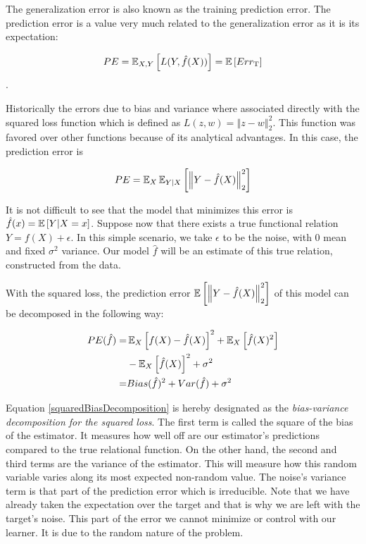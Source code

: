 The generalization error is also known as the training prediction error. The prediction error is a value very much related to the generalization error as it is its expectation:

\begin{equation}
 PE = \operatorname{\mathbb{E}}_{X,Y} \left[ L(Y,\hat{f}(X))\right] = \operatorname{\mathbb{E}} \left[ Err_{\mathrm{T}} \right]
 \end{equation}.

Historically the errors due to bias and variance where associated directly with the squared loss function which is defined as $L(z,w) = \left\Vert z-w \right\Vert^2_2$. This function was favored over other functions because of its analytical advantages. In this case, the prediction error is

\begin{equation}\label{squaredPE}
PE = \operatorname{\mathbb{E}}_X \operatorname{\mathbb{E}}_{Y|X} \left[ \left\Vert Y - \hat{f}(X) \right\Vert_2^2 \right]
\end{equation}

It is not difficult to see that the model that minimizes this error is $\hat{f}(x) = \operatorname{\mathbb{E}} \left[ Y | X=x \right] $. Suppose now that there exists a true functional relation $Y = f(X) + \epsilon$.
In this simple scenario, we take $\epsilon$ to be the noise, with $0$ mean and fixed $\sigma^2$ variance. Our model $\hat{f}$ will be an estimate of this true relation, constructed from the data.

With the squared loss, the prediction error $\operatorname{\mathbb{E}} \left[ \left\Vert Y - \hat{f}(X) \right\Vert_2^2 \right]$ of this model can be decomposed in the following way:

\begin{equation}\label{squaredBiasDecomposition}
\begin{split}
PE( \hat{f} ) = & \operatorname{\mathbb{E}}_X \left[  f(X) - \hat{f}(X) \right]^2 + \operatorname{\mathbb{E}}_X \left[ \hat{f}(X)^2 \right] \\
& - \operatorname{\mathbb{E}}_X \left[ \hat{f}(X) \right]^2 + \sigma^2 \\
= & Bias(\hat{f})^2 + Var(\hat{f}) + \sigma^2
\end{split}
\end{equation}

Equation \cref{squaredBiasDecomposition} is hereby designated as the \textit{bias-variance decomposition for the squared loss}. The first term is called the square of the bias of the estimator. It measures how well off are our estimator's predictions compared to the true relational function. On the other hand, the second and third terms are the variance of the estimator. This will measure how this random variable varies along its most expected non-random value. The noise's variance term is that part of the prediction error which is irreducible. Note that we have already taken the expectation over the target and that is why we are left with the target's noise. This part of the error we cannot minimize or control with our learner. It is due to the random nature of the problem.

